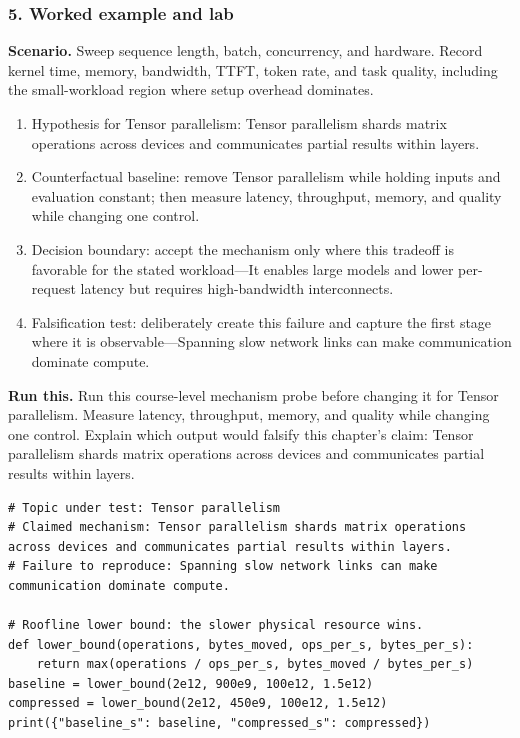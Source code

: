 \subsubsection*{5. Worked example and lab}
\textbf{Scenario.} Sweep sequence length, batch, concurrency, and hardware. Record kernel time, memory, bandwidth, TTFT, token rate, and task quality, including the small-workload region where setup overhead dominates.
\begin{enumerate}
\item Hypothesis for Tensor parallelism: Tensor parallelism shards matrix operations across devices and communicates partial results within layers.
\item Counterfactual baseline: remove Tensor parallelism while holding inputs and evaluation constant; then measure latency, throughput, memory, and quality while changing one control.
\item Decision boundary: accept the mechanism only where this tradeoff is favorable for the stated workload—It enables large models and lower per-request latency but requires high-bandwidth interconnects.
\item Falsification test: deliberately create this failure and capture the first stage where it is observable—Spanning slow network links can make communication dominate compute.
\end{enumerate}
\textbf{Run this.} Run this course-level mechanism probe before changing it for Tensor parallelism. Measure latency, throughput, memory, and quality while changing one control. Explain which output would falsify this chapter's claim: Tensor parallelism shards matrix operations across devices and communicates partial results within layers.
\begin{Verbatim}[fontsize=\scriptsize]
# Topic under test: Tensor parallelism
# Claimed mechanism: Tensor parallelism shards matrix operations across devices and communicates partial results within layers.
# Failure to reproduce: Spanning slow network links can make communication dominate compute.

# Roofline lower bound: the slower physical resource wins.
def lower_bound(operations, bytes_moved, ops_per_s, bytes_per_s):
    return max(operations / ops_per_s, bytes_moved / bytes_per_s)
baseline = lower_bound(2e12, 900e9, 100e12, 1.5e12)
compressed = lower_bound(2e12, 450e9, 100e12, 1.5e12)
print({"baseline_s": baseline, "compressed_s": compressed})
\end{Verbatim}
